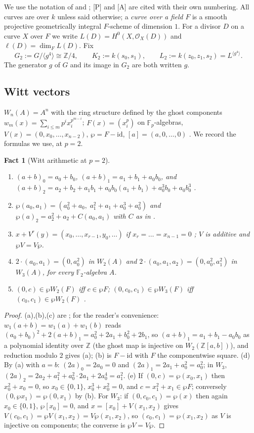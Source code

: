 \documentclass[11pt]{amsart}
\newtheorem{fact}[theorem]{Fact}
\theoremstyle{definition}
\theoremstyle{remark}
\newcommand{\Z}{\mathbb Z}
\newcommand{\F}{\mathbb F}
\begin{document}
We use the notation of \cite[Sections 2--7]{P} and \cite[Section 11]{A}; [P] and [A]
are cited with their own numbering. All curves are over $k$ unless said otherwise; a
\emph{curve over a field $F$} is a smooth projective geometrically integral $F$-scheme
of dimension $1$. For a divisor $D$ on a curve $X$ over $F$ we write
$L(D)=H^0(X,\mathcal O_X(D))$ and $\ell(D)=\dim_FL(D)$. Fix
\[
G_2:=G/\langle g^4\rangle\cong\Z/4,\qquad K_2:=k(s_0,s_1),\qquad
L_2:=k(z_0,z_1,s_2)=L^{\langle g^4\rangle}.
\]
The generator $g$ of $G$ and its image in $G_2$ are both written $g$.

\subsection{Witt vectors}\label{ss:witt}
$W_n(A)=A^n$ with the ring structure defined by the ghost components
$w_m(x)=\sum_{i\le m}p^ix_i^{p^{m-i}}$; $F(x)=(x_i^p)$ on $\F_p$-algebras,
$V(x)=(0,x_0,\dots,x_{n-2})$, $\wp=F-\mathrm{id}$, $[a]=(a,0,\dots,0)$
\cite[\S2.2]{P}. We record the formulas we use, at $p=2$.

\begin{fact}[Witt arithmetic at $p=2$]\label{fact:witt}
\begin{enumerate}[label=\textup{(\alph*)}]
\item $(a+b)_0=a_0+b_0$, $(a+b)_1=a_1+b_1+a_0b_0$, and
$(a+b)_2=a_2+b_2+a_1b_1+a_0b_0(a_1+b_1)+a_0^3b_0+a_0b_0^3$ \cite[(3)]{P}.
\item $\wp(a_0,a_1)=(a_0^2+a_0,\;a_1^2+a_1+a_0^3+a_0^2)$ and
$\wp(a)_2=a_2^2+a_2+C(a_0,a_1)$ with $C$ as in \cite[(4)]{P}.
\item $x+V^r(y)=(x_0,\dots,x_{r-1},y_0,\dots)$ if $x_r=\dots=x_{n-1}=0$
\cite[(2)]{P}; $V$ is additive and $\wp V=V\wp$.
\item $2\cdot(a_0,a_1)=(0,a_0^2)$ in $W_2(A)$ and $2\cdot(a_0,a_1,a_2)=(0,a_0^2,a_1^2)$
in $W_3(A)$, for every $\F_2$-algebra $A$.
\item $(0,c)\in\wp W_2(F)$ iff $c\in\wp F$; $(0,c_0,c_1)\in\wp W_3(F)$ iff
$(c_0,c_1)\in\wp W_2(F)$ \cite[(5)]{P}.
\end{enumerate}
\end{fact}

\begin{proof}
(a),(b),(c) are \cite[\S2.2]{P}; for the reader's convenience: $w_1(a+b)=w_1(a)+w_1(b)$
reads $(a_0+b_0)^2+2(a+b)_1=a_0^2+2a_1+b_0^2+2b_1$, so $(a+b)_1=a_1+b_1-a_0b_0$
as a polynomial identity over $\Z$ (the ghost map is injective on $W_2(\Z[a,b])$), and
reduction modulo $2$ gives (a); (b) is $F-\mathrm{id}$ with $F$ the componentwise
square. (d) By (a) with $a=b$: $(2a)_0=2a_0=0$ and $(2a)_1=2a_1+a_0^2=a_0^2$; in
$W_3$, $(2a)_2=2a_2+a_1^2+a_0^2\cdot2a_1+2a_0^4=a_1^2$. (e) If $(0,c)=\wp(x_0,x_1)$
then $x_0^2+x_0=0$, so $x_0\in\{0,1\}$, $x_0^3+x_0^2=0$, and $c=x_1^2+x_1\in\wp F$;
conversely $(0,\wp x_1)=\wp(0,x_1)$ by (b). For $W_3$: if $(0,c_0,c_1)=\wp(x)$ then
again $x_0\in\{0,1\}$, $\wp[x_0]=0$, and $x=[x_0]+V(x_1,x_2)$ gives
$V(c_0,c_1)=\wp V(x_1,x_2)=V\wp(x_1,x_2)$, so $(c_0,c_1)=\wp(x_1,x_2)$ as $V$ is
injective on components; the converse is $\wp V=V\wp$.
\end{proof}
\end{document}
